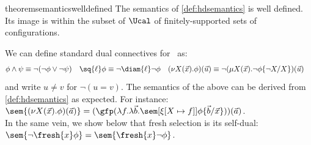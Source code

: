 \begin{restatable}{theorem}{semanticswelldefined}\label{thm:semanticswelldefined}
The semantics of \cref{def:hdsemantics} is well defined. Its image is within the subset of $\Ucal$ of finitely-supported sets of configurations.
\end{restatable}

\begin{remark}\label{rem:derived}
  We can define standard dual connectives for \fhml\ as:
  \begin{align*}
    \phi\land\psi &\equiv \lnot(\lnot\phi\lor\lnot\psi) &
    \sq{\ell}\phi &\equiv \lnot\diam{\ell}\lnot\phi &                        (\nu X(\vec x).\phi)(\vec u) &\equiv \lnot(\mu X(\vec x).\lnot\phi\{\lnot X/X\})(\vec u)
  \end{align*}
  and write $u\neq v$ for $\lnot(u=v)$. The semantics of the above can be derived from \cref{def:hdsemantics} as expected. For instance:\
$
  \sem{(\nu X(\vec x).\phi)(\vec a)} = (\gfp(\lambda f.\lambda\vec b. \sem[{\xi[X\mapsto f]}]{\phi\{\vec b / \vec x\}}))(\vec a)
  $.\\
  In the same vein,
  we show below that fresh selection is its self-dual:
  $\sem{\lnot\fresh{x}\phi}=\sem{\fresh{x}\lnot\phi}$.
\end{remark}

